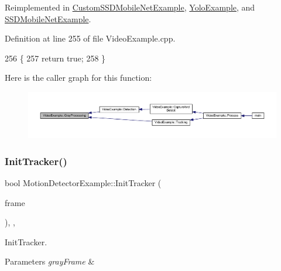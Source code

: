 Reimplemented in \mbox{\hyperlink{class_custom_s_s_d_mobile_net_example_a4c3fe9ac68b5ef4f51d91a6322c5da02}{Custom\+S\+S\+D\+Mobile\+Net\+Example}}, \mbox{\hyperlink{class_yolo_example_aec0d91a32770f9a351d635c30ae54826}{Yolo\+Example}}, and \mbox{\hyperlink{class_s_s_d_mobile_net_example_a34d73a2badba0f9064506dbf276d5cbe}{S\+S\+D\+Mobile\+Net\+Example}}.



Definition at line 255 of file Video\+Example.\+cpp.


\begin{DoxyCode}
256 \{
257     \textcolor{keywordflow}{return} \textcolor{keyword}{true};
258 \}
\end{DoxyCode}
Here is the caller graph for this function\+:
\nopagebreak
\begin{figure}[H]
\begin{center}
\leavevmode
\includegraphics[width=350pt]{class_video_example_af8ea44f17711129d2b954d1f01fee1f0_icgraph}
\end{center}
\end{figure}
\mbox{\label{class_motion_detector_example_ae814c565a7d6a9dbab9e8a99c790a77f}} 
\subsubsection{\texorpdfstring{Init\+Tracker()}{InitTracker()}}
{\footnotesize\ttfamily bool Motion\+Detector\+Example\+::\+Init\+Tracker (\begin{DoxyParamCaption}\item[{cv\+::\+U\+Mat}]{frame }\end{DoxyParamCaption})\hspace{0.3cm}{\ttfamily [inline]}, {\ttfamily [protected]}, {\ttfamily [virtual]}}



Init\+Tracker. 


\begin{DoxyParams}{Parameters}
{\em gray\+Frame} & \\
\hline
\end{DoxyParams}


